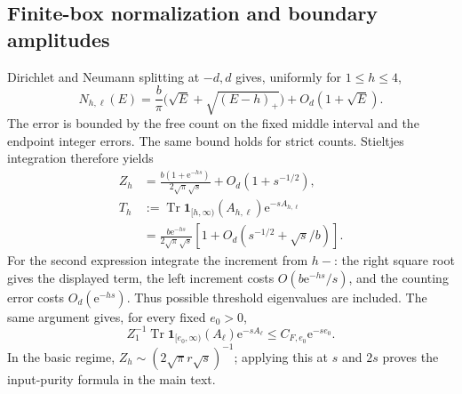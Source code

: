 \documentclass[aps,pra,reprint,superscriptaddress,longbibliography]{revtex4-2}
\newcommand{\Tr}{\operatorname{Tr}}
\newcommand{\ee}{\mathrm e}
\newcommand{\one}{\mathbf 1}
\begin{document}
\subsection{Finite-box normalization and boundary amplitudes}

Dirichlet and Neumann splitting at $-d,d$ gives, uniformly for
$1\le h\le4$,
\begin{equation}
 N_{h,\ell}(E)=\frac b\pi\bigl(\sqrt E+\sqrt{(E-h)_+}\bigr)
                      +O_d(1+\sqrt E).                 \label{eq:apcount}
\end{equation}
The error is bounded by the free count on the fixed middle interval
and the endpoint integer errors. The same bound holds for strict
counts. Stieltjes integration therefore yields
\begin{align}
 Z_h&=\frac{b(1+\ee^{-hs})}{2\sqrt\pi\sqrt s}
                              +O_d(1+s^{-1/2}),\nonumber\\
 T_h&:=\Tr\one_{[h,\infty)}(A_{h,\ell})\ee^{-sA_{h,\ell}}
 \nonumber\\
 &=\frac{b\ee^{-hs}}{2\sqrt\pi\sqrt s}
       [1+O_d(s^{-1/2}+\sqrt s/b)].                    \label{eq:apheat}
\end{align}
For the second expression integrate the increment from $h-$: the
right square root gives the displayed term, the left increment costs
$O(b\ee^{-hs}/s)$, and the counting error costs $O_d(\ee^{-hs})$.
Thus possible threshold eigenvalues are included. The same argument
gives, for every fixed $e_0>0$,
\begin{equation}
 Z_1^{-1}\Tr\one_{[e_0,\infty)}(A_\ell)\ee^{-sA_\ell}
                      \le C_{F,e_0}\ee^{-se_0}.         \label{eq:aptail}
\end{equation}
In the basic regime, $Z_h\sim(2\sqrt\pi r\sqrt s)^{-1}$; applying
this at $s$ and $2s$ proves the input-purity formula in the main text.
\end{document}
